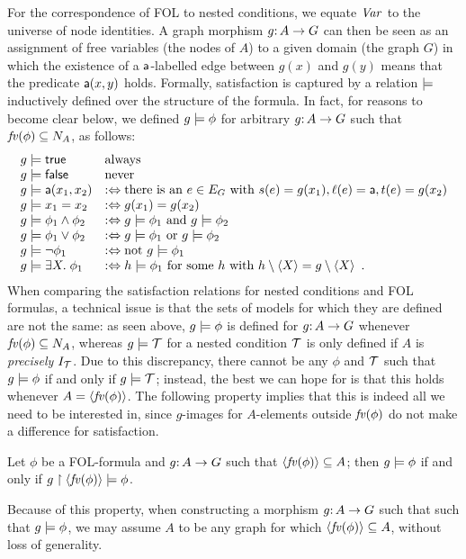 For the correspondence of FOL to nested conditions, we equate $\mathit{Var}$ to the universe of node identities. A graph morphism $g{:}\, A\rightarrow G$ can then be seen as an assignment of free variables (the nodes of $A$) to a given domain (the graph $G$) in which the existence of a $\mathsf{a}$-labelled edge between $g(x)$ and $g(y)$ means that the predicate $\mathsf{a}(x,y)$ holds. Formally, satisfaction is captured by a relation $\models$ inductively defined over the structure of the formula. In fact, for reasons to become clear below, we defined $g\models \phi$ for arbitrary $g{:}\, A\rightarrow G$ such that $\mathit{fv}(\phi)\subseteq N_A$, as follows:
%
\[\begin{array}{ll}
g\models \mathsf{true} & \text{always} \\
g\models \mathsf{false} & \text{never} \\
g\models \mathsf{a}(x_1,x_2) & :\Leftrightarrow \text{there is an } e\in E_G \text{ with } s(e)=g(x_1), \ell(e)=\mathsf{a}, t(e)=g(x_2) \\
g\models x_1=x_2 & :\Leftrightarrow g(x_1)=g(x_2) \\
g\models \phi_1\wedge \phi_2 & :\Leftrightarrow g\models \phi_1 \text{ and } g\models \phi_2 \\
g\models \phi_1\vee \phi_2 & :\Leftrightarrow g\models \phi_1 \text{ or } g\models \phi_2 \\
g\models \neg\phi_1 & :\Leftrightarrow \text{not } g\models \phi_1 \\
g\models \exists X.\; \phi_1  & :\Leftrightarrow h\models \phi_1 \text{ for some } h \text{ with } h\setminus \langle X\rangle =g\setminus \langle X\rangle \enspace.
\end{array}\]
%
When comparing the satisfaction relations for nested conditions and FOL formulas, a technical issue is that the sets of models for which they are defined are not the same: as seen above, $g\models\phi$ is defined for $g{:}\, A\rightarrow G$ whenever $\mathit{fv}(\phi)\subseteq N_A$, whereas $g\models{\mathcal{T}}$ for a nested condition ${\mathcal{T}}$ is only defined if $A$ is \emph{precisely} $I_{\mathcal{T}}$. Due to this discrepancy, there cannot be any $\phi$ and ${\mathcal{T}}$ such that $g\models \phi$ if and only if $g\models {\mathcal{T}}$; instead, the best we can hope for is that this holds whenever $A=\langle \mathit{fv}(\phi)\rangle$. The following property implies that this is indeed all we need to be interested in, since $g$-images for $A$-elements outside $\mathit{fv}(\phi)$ do not make a difference for satisfaction.

\begin{proposition}\label{prop:free vars only}
Let $\phi$ be a FOL-formula and $g{:}\, A\rightarrow G$ such that $\langle \mathit{fv}(\phi)\rangle\subseteq A$; then $g\models \phi$ if and only if $g\restriction \langle \mathit{fv}(\phi)\rangle\models \phi$.
\end{proposition}
%
Because of this property, when constructing a morphism $g{:}\, A\rightarrow G$ such that such that $g\models \phi$, we may assume $A$ to be any graph for which $\langle \mathit{fv}(\phi)\rangle\subseteq A$, without loss of generality.

